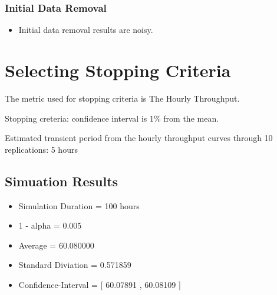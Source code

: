 \documentclass[aps,letterpaper,10pt]{revtex4}
\begin{document}
        \subsubsection{Initial Data Removal}
            \begin{itemize}
                \item Initial data removal results are noisy.
            \end{itemize}
            
            \begin{figure}[htp]
                \begin{center}
                \end{center}
            \end{figure}

\newpage
\section{Selecting Stopping Criteria}
    The metric used for stopping criteria is The Hourly Throughput.

    Stopping creteria: confidence interval is 1\% from the mean.

    Estimated transient period from the hourly throughput curves through 10
    replications: 5 hours
    \\

    \subsection{Simuation Results}
        \begin{itemize}
            \item Simulation Duration = 100 hours
            \item 1 - alpha = 0.005
            \item Average = 60.080000
            \item Standard Diviation = 0.571859
            \item Confidence-Interval = [ 60.07891 , 60.08109 ]
        \end{itemize}
\end{document}
